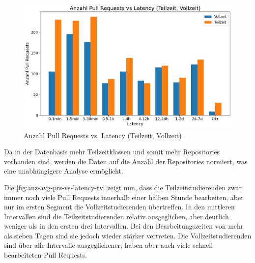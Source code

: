 \begin{figure}[htbp]
    \includegraphics[width=\textwidth]{Figures/anz-prs-vs-latency-tv.png}
    \caption{Anzahl Pull Requests vs. Latency (Teilzeit, Vollzeit)}
    \label{fig:anz-prs-vs-latency-tv}
\end{figure}

Da in der Datenbasis mehr Teilzeitklassen und somit mehr Repositories vorhanden sind, werden die Daten auf die Anzahl der Repositories normiert, was eine unabhängigere Analyse ermöglicht.

Die \autoref{fig:anz-avg-prs-vs-latency-tv} zeigt nun, dass die Teilzeitstudierenden zwar immer noch viele Pull Requests innerhalb einer halben Stunde bearbeiten, aber nur im ersten Segment die Vollzeitstudierenden übertreffen. In den mittleren Intervallen sind die Teilzeitstudierenden relativ ausgeglichen, aber deutlich weniger als in den ersten drei Intervallen. Bei den Bearbeitungszeiten von mehr als sieben Tagen sind sie jedoch wieder stärker vertreten. Die Vollzeitstudierenden sind über alle Intervalle ausgeglichener, haben aber auch viele schnell bearbeiteten Pull Requests.


